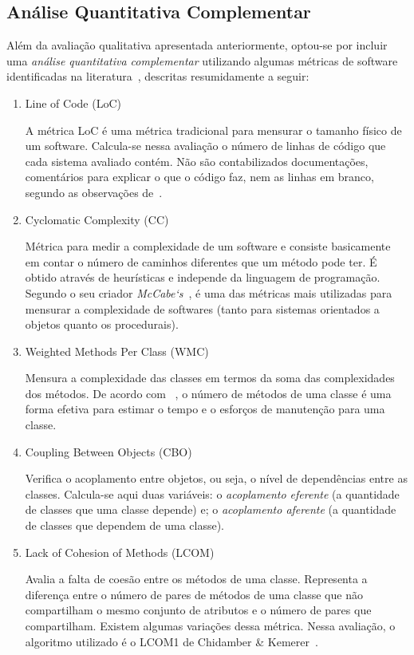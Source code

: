 \subsection{Análise Quantitativa Complementar}

Além da avaliação qualitativa apresentada anteriormente, optou-se por incluir uma \emph{análise quantitativa complementar} utilizando algumas métricas de software identificadas na literatura~\cite{chidamber1994metrics, fenton2014software, gyimothy2005empirical, mccabe1976complexity}, descritas resumidamente a seguir:

\begin{enumerate}[(M1)]

\item{Line of Code (LoC)}

A métrica LoC é uma métrica tradicional para mensurar o tamanho físico de um software. Calcula-se nessa avaliação o número de linhas de código que cada sistema avaliado contém. Não são contabilizados documentações, comentários para explicar o que o código faz, nem as linhas em branco, segundo as observações de~\cite{fenton2014software}.

\item{Cyclomatic Complexity (CC)}

Métrica para medir a complexidade de um software e consiste basicamente em contar o número de caminhos diferentes que um método pode ter. É obtido através de heurísticas e independe da linguagem de programação.
Segundo o seu criador \emph{McCabe`s}~\cite{mccabe1976complexity}, é uma das métricas mais utilizadas para mensurar a complexidade de softwares (tanto para sistemas orientados a objetos quanto os procedurais).


\item{Weighted Methods Per Class (WMC)}

Mensura a complexidade das classes em termos da soma das complexidades dos métodos. De acordo com ~\cite{chidamber1994metrics}, o número de métodos de uma classe é uma forma efetiva para estimar o tempo e o esforços de manutenção para uma classe.


\item{Coupling Between Objects (CBO)}

Verifica o acoplamento entre objetos, ou seja, o nível de dependências entre as classes. Calcula-se aqui duas variáveis: o \emph{acoplamento eferente} (a quantidade de classes que uma classe depende) e; o \emph{acoplamento aferente} (a quantidade de classes que dependem de uma classe).

\item{Lack of Cohesion of Methods (LCOM)}

Avalia a falta de coesão entre os métodos de uma classe. Representa a diferença entre o número de pares de métodos de uma classe que não compartilham o mesmo conjunto de atributos e o número de pares que compartilham. Existem algumas variações dessa métrica. Nessa avaliação, o algoritmo utilizado é o LCOM1 de Chidamber \& Kemerer~\cite{chidamber1994metrics}.

\end{enumerate}


